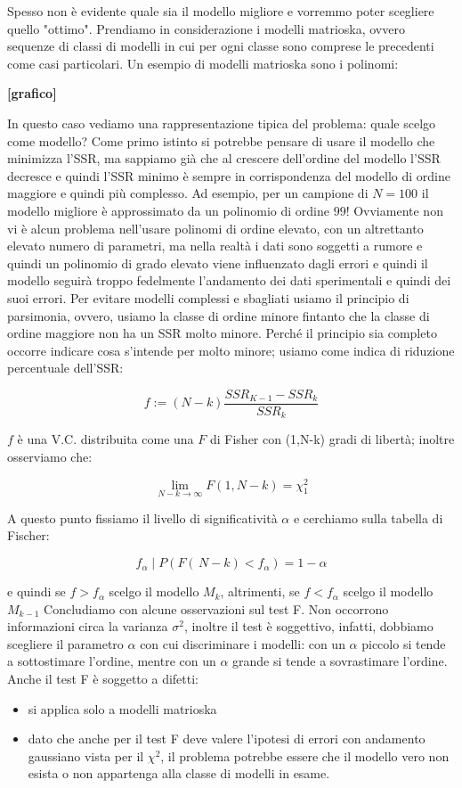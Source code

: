 Spesso non è evidente quale sia il modello migliore e vorremmo poter scegliere quello "ottimo". Prendiamo in considerazione i modelli matrioska, ovvero sequenze di classi di modelli in cui per ogni classe sono comprese le precedenti come casi particolari. Un esempio di modelli matrioska sono i polinomi:
\begin{center}
\textbf{[grafico]}
\end{center}
In questo caso vediamo una rappresentazione tipica del problema: quale scelgo come modello? Come primo istinto si potrebbe pensare di usare il modello che minimizza l'SSR, ma sappiamo già che al crescere dell'ordine del modello l'SSR decresce e quindi l'SSR minimo è sempre in corrispondenza del modello di ordine maggiore e quindi più complesso. Ad esempio, per un campione di $N=100$ il modello migliore è approssimato da un polinomio di ordine $99$! Ovviamente non vi è alcun problema nell'usare polinomi di ordine elevato, con un altrettanto elevato numero di parametri, ma nella realtà i dati sono soggetti a rumore e quindi un polinomio di grado elevato viene influenzato dagli errori e quindi il modello seguirà troppo fedelmente l'andamento dei dati sperimentali e quindi dei suoi errori.\newline
Per evitare modelli complessi e sbagliati usiamo il principio di parsimonia, ovvero, usiamo la classe di ordine minore fintanto che la classe di ordine maggiore non ha un SSR molto minore. Perché il principio sia completo occorre indicare cosa s'intende per molto minore; usiamo come indica di riduzione percentuale dell'SSR:

    \[ f:=(N-k)\frac{SSR_{K-1}-SSR_k}{SSR_k} \]

$f$ è una V.C. distribuita come una $F$ di Fisher con (1,N-k) gradi di libertà; inoltre osserviamo che:

    \[ \lim_{N-k\rightarrow\infty} {F(1,N-k)}=\chi_1^2 \]

A questo punto fissiamo il livello di significatività $\alpha$ e cerchiamo sulla tabella di Fischer:

    \[ f_\alpha \mid P(F(\,N-k)<f_\alpha)=1-\alpha \]

e quindi se $f>f_\alpha$ scelgo il modello $M_k$, altrimenti, se $f<f_\alpha$ scelgo il modello $M_{k-1}$
Concludiamo con alcune osservazioni sul test F. Non occorrono informazioni circa la varianza $\sigma^2$, inoltre il test è soggettivo, infatti, dobbiamo scegliere il parametro $\alpha$ con cui discriminare i modelli: con un $\alpha$ piccolo si tende a sottostimare l'ordine, mentre con un $\alpha$ grande si tende a sovrastimare l'ordine.\newline
Anche il test F è soggetto a difetti:
\begin{itemize}
  \item si applica solo a modelli matrioska
  \item dato che anche per il test F deve valere l'ipotesi di errori con andamento gaussiano vista per il $\chi^2$, il problema potrebbe essere che il modello vero non esista o non appartenga alla classe di modelli in esame.
\end{itemize}
